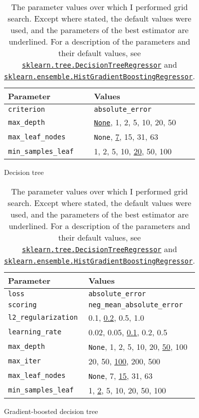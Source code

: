 \documentclass[11pt]{extarticle}
\newcommand{\None}{\texttt{None}}
\newcommand{\sklearn}[2]{\href{https://scikit-learn.org/stable/modules/generated/sklearn.#1.#2.html}{\lstinline|sklearn.#1.#2|}}
\newcommand{\subfigurespace}{\par\bigskip\bigskip}
\begin{document}
\begin{table}
  \centering
  \begin{subfigure}{\textwidth}
    \centering
    \begin{tabular}{ll}
      \toprule
      Parameter                   & Values
      \\
      \midrule
      \texttt{criterion}          & \texttt{absolute\_error}
      \\
      \midrule
      \texttt{max\_depth}         & \underline{\None}, 1, 2, 5, 10, 20, 50
      \\
      \texttt{max\_leaf\_nodes}   & \None, \underline{7}, 15, 31, 63
      \\
      \texttt{min\_samples\_leaf} & 1, 2, 5, 10, \underline{20}, 50, 100
      \\
      \bottomrule
    \end{tabular}
    \caption{Decision tree}
    \label{tab:chart-parameters-subtask-1-1}
  \end{subfigure}
  \subfigurespace
  \begin{subfigure}{\textwidth}
    \centering
    \begin{tabular}{ll}
      \toprule
      Parameter                   & Values
      \\
      \midrule
      \texttt{loss}               & \texttt{absolute\_error}
      \\
      \texttt{scoring}            & \texttt{neg\_mean\_absolute\_error}
      \\
      \midrule
      \texttt{l2\_regularization} & 0.1, \underline{0.2}, 0.5, 1.0
      \\
      \texttt{learning\_rate}     & 0.02, 0.05, \underline{0.1}, 0.2, 0.5
      \\
      \texttt{max\_depth}         & \None, 1, 2, 5, 10, 20, \underline{50}, 100
      \\
      \texttt{max\_iter}          & 20, 50, \underline{100}, 200, 500
      \\
      \texttt{max\_leaf\_nodes}   & \None, 7, \underline{15}, 31, 63
      \\
      \texttt{min\_samples\_leaf} & 1, \underline{2}, 5, 10, 20, 50, 100
      \\
      \bottomrule
    \end{tabular}
    \caption{Gradient-boosted decision tree}
    \label{tab:chart-parameters-subtask-1-2}
  \end{subfigure}
  \caption{The parameter values over which I performed grid search.
    Except where stated, the default values were used, and the parameters of the best
    estimator are underlined.
    For a description of the parameters and their default values, see
    \sklearn{tree}{DecisionTreeRegressor} and
    \sklearn{ensemble}{HistGradientBoostingRegressor}.
  }
  \label{tab:chart-parameters-subtask-1}
\end{table}
\end{document}
